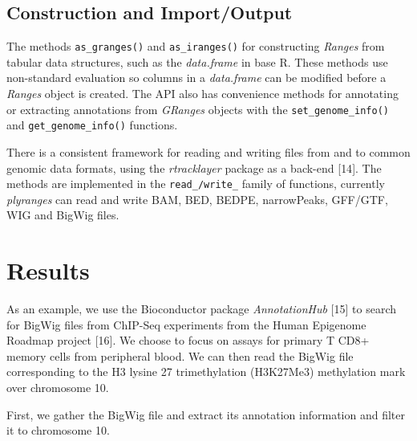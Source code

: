 \documentclass[10pt,letterpaper]{article}
\newenvironment{Shaded}{\begin{snugshade}}{\end{snugshade}}
\newcommand{\KeywordTok}[1]{\textcolor[rgb]{0.13,0.29,0.53}{\textbf{#1}}}
\newcommand{\StringTok}[1]{\textcolor[rgb]{0.31,0.60,0.02}{#1}}
\newcommand{\OperatorTok}[1]{\textcolor[rgb]{0.81,0.36,0.00}{\textbf{#1}}}
\newcommand{\NormalTok}[1]{#1}
\begin{document}
\subsection{Construction and
Import/Output}\label{construction-and-importoutput}

The methods \texttt{as\_granges()} and \texttt{as\_iranges()} for
constructing \emph{Ranges} from tabular data structures, such as the
\emph{data.frame} in base R. These methods use non-standard evaluation
so columns in a \emph{data.frame} can be modified before a \emph{Ranges}
object is created. The API also has convenience methods for annotating
or extracting annotations from \emph{GRanges} objects with the
\texttt{set\_genome\_info()} and \texttt{get\_genome\_info()} functions.

There is a consistent framework for reading and writing files from and
to common genomic data formats, using the \emph{rtracklayer} package as
a back-end {[}14{]}. The methods are implemented in the
\texttt{read\_/write\_} family of functions, currently \emph{plyranges}
can read and write BAM, BED, BEDPE, narrowPeaks, GFF/GTF, WIG and BigWig
files.

\section{Results}\label{results}

As an example, we use the Bioconductor package \emph{AnnotationHub}
{[}15{]} to search for BigWig files from ChIP-Seq experiments from the
Human Epigenome Roadmap project {[}16{]}. We choose to focus on assays
for primary T CD8+ memory cells from peripheral blood. We can then read
the BigWig file corresponding to the H3 lysine 27 trimethylation
(H3K27Me3) methylation mark over chromosome 10.

First, we gather the BigWig file and extract its annotation information
and filter it to chromosome 10.

\begin{Shaded}
\end{Shaded}
\end{document}
